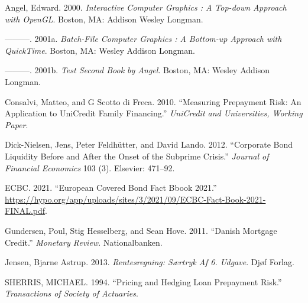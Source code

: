 \documentclass[12pt,twoside]{reedthesis}
\newlength{\cslhangindent}
\newenvironment{CSLReferences}[2] %
 {%
  \setlength{\parindent}{0pt}
  \ifodd #1 \everypar{\setlength{\hangindent}{\cslhangindent}}\ignorespaces\fi
  \ifnum #2 > 0
  \setlength{\parskip}{#2\baselineskip}
  \fi
 }%
 {}
\begin{document}
\setlength{\parindent}{-0.20in}

\hypertarget{refs}{}
\begin{CSLReferences}{1}{0}
\leavevmode{}%
Angel, Edward. 2000. \emph{Interactive Computer Graphics : A Top-down Approach with OpenGL}. Boston, MA: Addison Wesley Longman.

\leavevmode{}%
---------. 2001a. \emph{Batch-File Computer Graphics : A Bottom-up Approach with QuickTime}. Boston, MA: Wesley Addison Longman.

\leavevmode{}%
---------. 2001b. \emph{Test Second Book by Angel}. Boston, MA: Wesley Addison Longman.

\leavevmode{}%
Consalvi, Matteo, and G Scotto di Freca. 2010. {``Measuring Prepayment Risk: An Application to UniCredit Family Financing.''} \emph{UniCredit and Universities, Working Paper}.

\leavevmode{}%
Dick-Nielsen, Jens, Peter Feldhütter, and David Lando. 2012. {``Corporate Bond Liquidity Before and After the Onset of the Subprime Crisis.''} \emph{Journal of Financial Economics} 103 (3). Elsevier: 471--92.

\leavevmode{}%
ECBC. 2021. {``European Covered Bond Fact Bbook 2021.''} \url{https://hypo.org/app/uploads/sites/3/2021/09/ECBC-Fact-Book-2021-FINAL.pdf}.

\leavevmode{}%
Gundersen, Poul, Stig Hesselberg, and Sean Hove. 2011. {``Danish Mortgage Credit.''} \emph{Monetary Review}. Nationalbanken.

\leavevmode{}%
Jensen, Bjarne Astrup. 2013. \emph{Rentesregning: S{æ}rtryk Af 6. Udgave}. Dj{ø}f Forlag.

\leavevmode{}%
SHERRIS, MICHAEL. 1994. {``Pricing and Hedging Loan Prepayment Risk.''} \emph{Transactions of Society of Actuaries}.

\end{CSLReferences}

\end{document}
